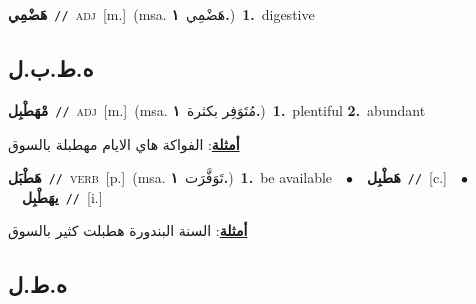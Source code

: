 \documentclass[10pt,a4paper,twoside]{article} %
\begin{document}
\begin{multicols}{2}
{\setlength\topsep{0pt}\textbf{\foreignlanguage{arabic}{هَضْمِي}}\ {\color{gray}\texttt{//}\color{black}}\ \textsc{adj}\ [m.]\ \color{gray}(msa. \foreignlanguage{arabic}{هَضْمِي}~\foreignlanguage{arabic}{\textbf{١.}})\color{black}\ \textbf{1.}~digestive\ } \vspace{2mm}

\vspace{-3mm}
\subsection*{\color{blue}\foreignlanguage{arabic}{ه.ط.ب.ل}\color{blue}{}} 

{\setlength\topsep{0pt}\textbf{\foreignlanguage{arabic}{مْهَطْبِل}}\ {\color{gray}\texttt{//}\color{black}}\ \textsc{adj}\ [m.]\ \color{gray}(msa. \foreignlanguage{arabic}{مُتَوَفِر بكثرة}~\foreignlanguage{arabic}{\textbf{١.}})\color{black}\ \textbf{1.}~plentiful  \textbf{2.}~abundant\  \begin{flushright}\color{gray}\foreignlanguage{arabic}{\textbf{\underline{\foreignlanguage{arabic}{أمثلة}}}: الفواكة هاي الايام مهطبلة بالسوق}\end{flushright}\color{black}} \vspace{2mm}

{\setlength\topsep{0pt}\textbf{\foreignlanguage{arabic}{هَطْبَل}}\ {\color{gray}\texttt{//}\color{black}}\ \textsc{verb}\ [p.]\ \color{gray}(msa. \foreignlanguage{arabic}{تَوَفَّرَت}~\foreignlanguage{arabic}{\textbf{١.}})\color{black}\ \textbf{1.}~be available\ \ $\bullet$\ \ \setlength\topsep{0pt}\textbf{\foreignlanguage{arabic}{هَطْبِل}}\ {\color{gray}\texttt{//}\color{black}}\ [c.]\ \ $\bullet$\ \ \setlength\topsep{0pt}\textbf{\foreignlanguage{arabic}{يهَطْبِل}}\ {\color{gray}\texttt{//}\color{black}}\ [i.]\  \begin{flushright}\color{gray}\foreignlanguage{arabic}{\textbf{\underline{\foreignlanguage{arabic}{أمثلة}}}: السنة البندورة هطبلت كثير بالسوق}\end{flushright}\color{black}} \vspace{2mm}

\vspace{-3mm}
\subsection*{\color{blue}\foreignlanguage{arabic}{ه.ط.ل}\color{blue}{}} 


\end{multicols}
\end{document}

